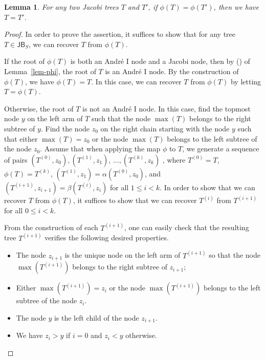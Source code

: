 \documentclass[12pt]{article}
\numberwithin{equation}{section}
\theoremstyle{plain}
\newcommand{\rmnum}[1]{\romannumeral #1}
\newtheorem{lemma}[theorem]{Lemma}
\def\JB{\mathsf{JB}}
\begin{document}
   	 		\begin{lemma}\label{lem-phi-reverse}
   	 		For any two Jacobi trees $T$ and $T'$,  if $\phi(T)=\phi(T')$, then we have $T=T'$. 
   	 	\end{lemma}
   	 	\begin{proof}
   	 		
   	 		In order to prove the assertion, it  suffices to  show that for any tree $T\in \JB_S$, we can recover $T$ from $\phi(T)$.   
   	 		
   	 		
   	 		If the root of $\phi(T)$ is both   an Andr\'e   $\mathrm{I}$  node and a Jacobi node, then 
   	 		by (\rmnum{2}) of Lemma~\ref{lem-phi},  the root of $T$ is an Andr\'e  $\mathrm{I}$  node.  By the construction of $\phi(T)$, we have $\phi(T)=T$. In this case, we can recover $T$ from $\phi(T)$ by letting $T=\phi(T)$.  
   	 		
   	 		
   	 		Otherwise,  the root of $T$ is not an Andr\'e   $\mathrm{I}$  node.  In this case,   find the topmost node $y$ on the left arm of $T$  such that the node $\max(T)$  belongs to the right subtree of  $y$.      
   	 		Find the node $z_0$ on the right chain starting with the node $y$ such that either $\max(T)=z_0$ or  the node $\max(T)$ belongs to the left subtree of the node $z_0$. Assume that when applying the map $\phi$ to $T$, we generate a sequence  of pairs $(T^{(0)}, z_0), (T^{(1)}, z_1)$, $\ldots, (T^{(k)}, z_k)$ , where $T^{(0)}=T$, $\phi(T)=T^{(k)}$, $(T^{(1)}, z_1)=\alpha(T^{(0)}, z_0)$, and  $(T^{(i+1)}, z_{i+1})=\beta(T^{(i)}, z_i)$ for all $1\leq i<k$.  In order to show that  we can recover $T$ from $\phi(T)$, it suffices to show that we can recover   $T^{(i)}$ from    $T^{(i+1)}$ for all $0\leq i<k$.   
   	 		
   	 		
   	 		From the construction of each $T^{(i+1)}$,  one can easily check that the resulting tree $T^{(i+1)}$ verifies the following desired properties. 
   	 		\begin{itemize}
   	 			\item[\upshape{(\rmnum{1})}]  The node $z_{i+1}$ is the unique  node 
   	 			on the left arm of $T^{(i+1)}$ so that the node $\max(T^{(i+1)})$ belongs to the right subtree of $z_{i+1}$;
   	 			\item[\upshape{(\rmnum{2})}]   Either $\max(T^{(i+1)})=z_i$ or the node $\max(T^{(i+1)})$ belongs to the left subtree of the node $z_i$. 
   	 			\item[\upshape{(\rmnum{3})}]  The node $y$ is the left child of the node $z_{i+1}$.
   	 			\item[\upshape{(\rmnum{4})}] We have $z_i>y$ if $i=0$ and $z_i<y$ otherwise. 
   	 		\end{itemize}
   	 		

\end{proof}
\end{document}
